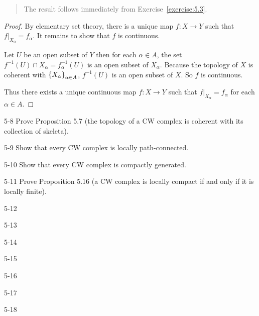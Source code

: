 \begin{quote}
	The result follows immediately from Exercise~\ref{exercise:5.3}.
\end{quote}

\begin{proof}
	By elementary set theory, there is a unique map $f: X \to Y$ such that $f\vert_{X_{\alpha}} = f_{\alpha}$. It remains to show that $f$ is continuous.

	Let $U$ be an open subset of $Y$ then for each $\alpha\in A$, the set $f^{-1}(U) \cap X_{\alpha} = f_{\alpha}^{-1}(U)$ is an open subset of $X_{\alpha}$. Because the topology of $X$ is coherent with $\left\{{X_{\alpha}}\right\}_{\alpha\in A}$, $f^{-1}(U)$ is an open subset of $X$. So $f$ is continuous.

	Thus there exists a unique continuous map $f: X\to Y$ such that $f\vert_{X_{\alpha}} = f_{\alpha}$ for each $\alpha\in A$.
\end{proof}

\begin{problem}{5-8}\label{problem:5-8}
Prove Proposition 5.7 (the topology of a CW complex is coherent with its
collection of skeleta).
\end{problem}

\begin{problem}{5-9}\label{problem:5-9}
Show that every CW complex is locally path-connected.
\end{problem}

\begin{problem}{5-10}\label{problem:5-10}
Show that every CW complex is compactly generated.
\end{problem}

\begin{problem}{5-11}\label{problem:5-11}
Prove Proposition 5.16 (a CW complex is locally compact if and only if it is locally finite).
\end{problem}

\begin{problem}{5-12}\label{problem:5-12}
\end{problem}

\begin{problem}{5-13}\label{problem:5-13}
\end{problem}

\begin{problem}{5-14}\label{problem:5-14}
\end{problem}

\begin{problem}{5-15}\label{problem:5-15}
\end{problem}

\begin{problem}{5-16}\label{problem:5-16}
\end{problem}

\begin{problem}{5-17}\label{problem:5-17}
\end{problem}

\begin{problem}{5-18}\label{problem:5-18}
\end{problem}
